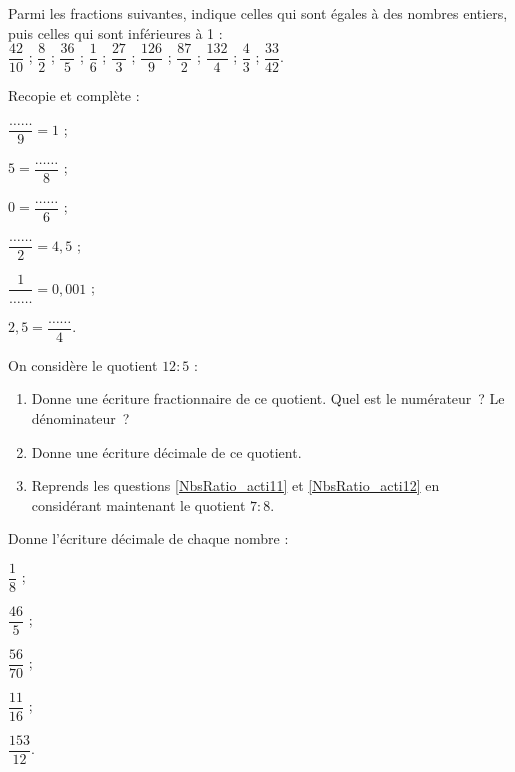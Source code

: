 \begin{exercice}
Parmi les fractions suivantes, indique celles qui sont égales à des nombres entiers, puis celles qui sont inférieures à 1 : \\[0.3em]
$\dfrac{42}{10}$ ; $\dfrac{8}{2}$ ; $\dfrac{36}{5}$ ; $\dfrac{1}{6}$ ; $\dfrac{27}{3}$ ; $\dfrac{126}{9}$ ; $\dfrac{87}{2}$ ; $\dfrac{132}{4}$ ; $\dfrac{4}{3}$ ; $\dfrac{33}{42}$.
\end{exercice}


\begin{exercice}
Recopie et complète :
\begin{colenumerate}{3}
 \item $\dfrac{\ldots \ldots}{9} = 1$ ;
 \item $5 = \dfrac{\ldots \ldots}{8}$ ;
 \item $0 = \dfrac{\ldots \ldots}{6}$ ;
 \item $\dfrac{\ldots \ldots}{2} = 4,5$ ;
 \item $\dfrac{1}{\ldots \ldots} = 0,001$ ;
 \item $2,5 = \dfrac{\ldots \ldots}{4}$.
 \end{colenumerate}
\end{exercice}


\begin{exercice}
On considère le quotient $12 : 5$ :
\begin{enumerate}
 \item Donne une écriture fractionnaire de ce quotient. Quel est le numérateur ? Le dénominateur ? \label{NbsRatio_acti11}
 \item Donne une écriture décimale de ce quotient. \label{NbsRatio_acti12}
 \item Reprends les questions \ref{NbsRatio_acti11} et \ref{NbsRatio_acti12} en considérant maintenant le quotient $7 : 8$.
 \end{enumerate}
\end{exercice}


\begin{exercice}
Donne l'écriture décimale de chaque nombre :
\begin{colenumerate}{5}
 \item $\dfrac{1}{8}$ ; 
 \item $\dfrac{46}{5}$ ; 
 \item $\dfrac{56}{70}$ ; 
 \item $\dfrac{11}{16}$ ; 
 \item $\dfrac{153}{12}$.
 \end{colenumerate}
\end{exercice}


